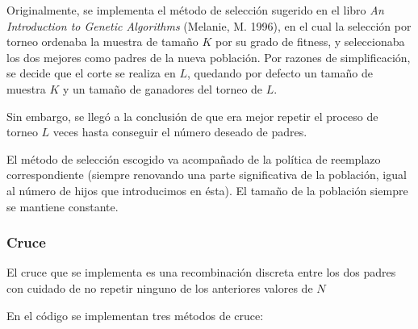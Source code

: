 \documentclass[12pt]{article}
\begin{document}
Originalmente, se implementa el método de selección sugerido en el libro \emph{An Introduction to Genetic Algorithms} (Melanie, M. 1996), en el cual la selección por torneo ordenaba la muestra de tamaño $K$ por su grado de fitness, y seleccionaba los dos mejores como padres de la nueva población. Por razones de simplificación, se decide que el corte se realiza en $L$, quedando por defecto un tamaño de muestra $K$ y un tamaño de ganadores del torneo de $L$.

Sin embargo, se llegó a la conclusión de que era mejor repetir el proceso de torneo $L$ veces hasta conseguir el número deseado de padres.

El método de selección escogido va acompañado de la política de reemplazo correspondiente (siempre renovando una parte significativa de la población, igual al número de hijos que introducimos en ésta). El tamaño de la población siempre se mantiene constante.

\subsubsection{Cruce}

El cruce que se implementa es una recombinación discreta entre los dos padres con cuidado de no repetir ninguno de los anteriores valores de $N$ 

En el código se implementan tres métodos de cruce:
\end{document}
